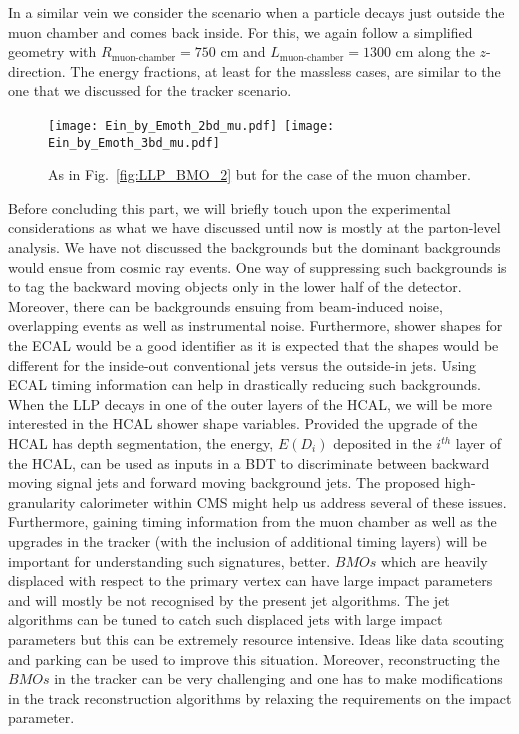 \documentclass[10pt]{article}
\begin{document}
In a similar vein we consider the scenario when a particle decays just outside the muon chamber and comes back inside. For this, we again follow a simplified geometry with $R_\text{muon-chamber} = 750$ cm and $L_\text{muon-chamber} = 1300$ cm along the $z$-direction. The energy fractions, at least for the massless cases, are similar to the one that we discussed for the tracker scenario.

\begin{figure}[!h]
	\centering
	\texttt{[image: Ein\_by\_Emoth\_2bd\_mu.pdf]}~\texttt{[image: Ein\_by\_Emoth\_3bd\_mu.pdf]}
	\caption{As in Fig.~\ref{fig:LLP_BMO_2} but for the case of the muon chamber.}
	\label{fig:Efac-mu}
\end{figure}

Before concluding this part, we will briefly touch upon the experimental considerations as what we have discussed until now is mostly at the parton-level analysis. We have not discussed the backgrounds but the dominant backgrounds would ensue from cosmic ray events. One way of suppressing such backgrounds is to tag the backward moving objects only in the lower half of the detector. Moreover, there can be backgrounds ensuing from beam-induced noise, overlapping events as well as instrumental noise. Furthermore, shower shapes for the ECAL would be a good identifier as it is expected that the shapes would be different for the inside-out conventional jets versus the outside-in jets. Using ECAL timing information can help in drastically reducing such backgrounds. When the LLP decays in one of the outer layers of the HCAL, we will be more interested in the HCAL shower shape variables. Provided the upgrade of the HCAL has depth segmentation, the energy, $E(D_i)$ deposited in the $i^{th}$ layer of the HCAL, can be used as inputs in a BDT to discriminate between backward moving signal jets and forward moving background jets. The proposed high-granularity calorimeter within CMS might help us address several of these issues. Furthermore, gaining timing information from the muon chamber as well as the upgrades in the tracker (with the inclusion of additional timing layers) will be important for understanding such signatures, better. $BMOs$ which are heavily displaced with respect to the primary vertex can have large impact parameters and will mostly be not recognised by the present jet algorithms. The jet algorithms can be tuned to catch such displaced jets with large impact parameters but this can be extremely resource intensive. Ideas like data scouting and parking can be used to improve this situation. Moreover, reconstructing the $BMOs$ in the tracker can be very challenging and one has to make modifications in the track reconstruction algorithms by relaxing the requirements on the impact parameter.
\end{document}
